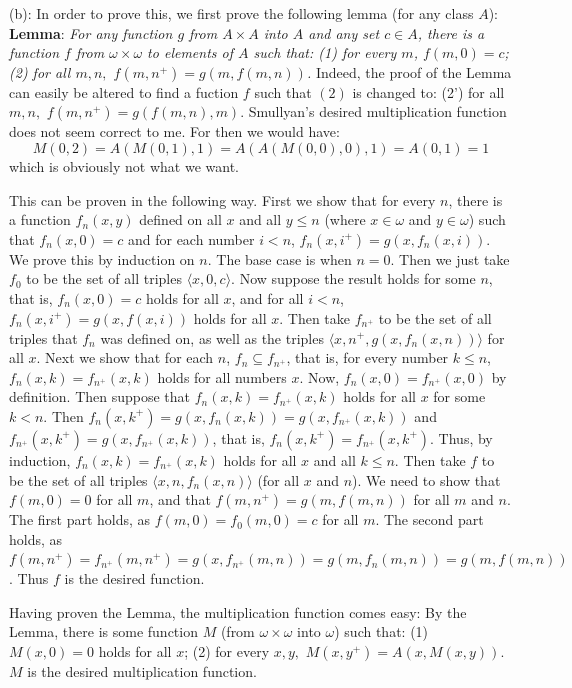 \documentclass{article}
\theoremstyle{definition}
\begin{document}
(b): In order to prove this, we first prove the following lemma (for any class $A$):\newline
\textbf{Lemma}:\textit{ For any function $g$ from $A\times A$ into $A$ and any set $c\in A$, there is a function $f$ from $\omega\times\omega$ to elements of $A$ such that:\newline
(1) for every $m$, $f(m,0)=c$;\newline
(2) for all $m,n,$ $f(m,n^+)=g(m,f(m,n))$.}
\newline Indeed, the proof of the Lemma can easily be altered to find a fuction $f$ such that $(2)$ is changed to:\newline
(2') for all $m,n,$ $f(m,n^+)=g(f(m,n),m)$. Smullyan's desired multiplication function does not seem correct to me. For then we would have:
\[ M(0,2)=A(M(0,1),1)=A(A(M(0,0),0),1)=A(0,1)=1 \] which is obviously not what we want.

This can be proven in the following way. First we show that for every $n$, there is a function $f_n(x,y)$ defined on all $x$ and all $y\le n$ (where $x\in\omega$ and $y\in\omega$) such that 
$f_n(x,0)=c$ and for each number $i<n$, $f_n(x,i^+)=g(x,f_n(x,i))$. We prove this by induction on $n$. The base case is when $n=0$. Then we just take $f_0$ to be the set of all 
triples $\langle x,0,c\rangle$. Now suppose the result holds for some $n$, that is, $f_n(x,0)=c$ holds for all $x$, and for all $i<n$, 
$f_n(x,i^+)=g(x,f(x,i))$ holds for all $x$. Then take $f_{n^+}$ to be the set of all triples that $f_n$ was defined on, as well as the 
triples $\langle x,n^+,g(x,f_n(x,n))\rangle$ for all $x$. Next we show that for each $n$, $f_n\subseteq f_{n^+}$, that is, 
for every number $k\le n$, $f_n(x,k)=f_{n^+}(x,k)$ holds for all numbers $x$. Now, $f_n(x,0)=f_{n^+}(x,0)$ by definition. Then suppose that 
$f_n(x,k)=f_{n^+}(x,k)$ holds for all $x$ for some $k<n$. Then $f_n(x,k^+)=g(x,f_n(x,k))=g(x,f_{n^+}(x,k))$ and
$f_{n^+}(x,k^+)=g(x,f_{n^+}(x,k))$, that is, $f_n(x,k^+)=f_{n^+}(x,k^+)$. Thus, by induction, $f_n(x,k)=f_{n^+}(x,k)$ holds for all $x$ and all $k\le n$. Then take $f$ to be the 
set of all triples $\langle x,n,f_n(x,n)\rangle$ (for all $x$ and $n$). We need to show that 
$f(m,0)=0$ for all $m$, and that $f(m,n^+)=g(m,f(m,n))$ for all $m$ and $n$. The first part holds, as 
$f(m,0)=f_0(m,0)=c$ for all $m$. The second part holds, as
$f(m,n^+)=f_{n^+}(m,n^+)=g(x,f_{n^+}(m,n))=g(m,f_n(m,n))=g(m,f(m,n))$. Thus $f$ is the desired function.

Having proven the Lemma, the multiplication function comes easy: By the Lemma, there is some function $M$ (from $\omega\times\omega$ into $\omega$) such that:\newline
(1) $M(x,0)=0$ holds for all $x$;\newline
(2) for every $x,y,$ $M(x,y^+)=A(x,M(x,y))$.\newline
$M$ is the desired multiplication function.
\end{document}
